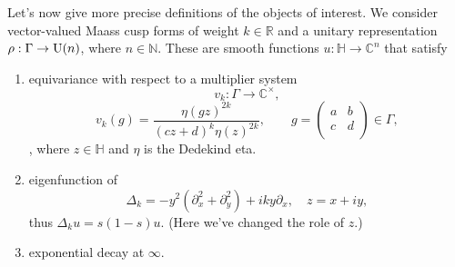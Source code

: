 \documentclass[reqno]{amsart} 
\numberwithin{theorem}{section}
\numberwithin{equation}{section}
\begin{document}
Let's now give more precise definitions of the objects of interest.  We consider vector-valued Maass cusp forms of weight $k \in \mathbb{R}$ and a unitary representation $\rho : \Gamma \rightarrow \operatorname{U}(n)$, where $n \in \mathbb{N}$.  These are smooth functions $u : \mathbb{H} \rightarrow \mathbb{C}^n$ that satisfy
\begin{enumerate}
\item equivariance with respect to a multiplier system
  \begin{equation*}
    v_k : \Gamma \rightarrow \mathbb{C}^\times,
  \end{equation*}
  \begin{equation*}
    v_k(g) = \frac{\eta(g z)^{2 k}}{(c z + d)^k \eta(z)^{2 k}}, \qquad
    g =
    \begin{pmatrix}
      a      & b \\
      c & d \\
    \end{pmatrix} \in \Gamma,
  \end{equation*},
  where $z \in \mathbb{H}$ and $\eta$ is the Dedekind eta.
\item eigenfunction of
  \begin{equation*}
    \Delta_k = - y^2(\partial_{x}^2 + \partial_y^2) + i k y \partial_x,
    \quad
    z = x + i y,
  \end{equation*}
  thus $\Delta_k u = s(1 - s) u$.  (Here we've changed the role of $z$.)
\item exponential decay at $\infty$.
\end{enumerate}
\end{document}
